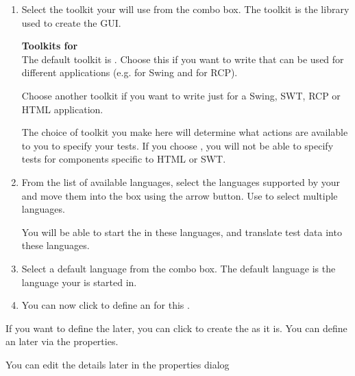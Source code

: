 \begin{enumerate}
\item Select the toolkit your \gdproject{} will use from the combo box. The toolkit is the library used to create the GUI. 

\textbf{Toolkits for \gdprojects{}}\\
\label{projtoolkit}
The default toolkit is . Choose this if you want to write \gdcases{} that can be used for different applications (e.g. for Swing and for RCP).

Choose another toolkit if you want to write \gdcases{} just for a Swing, SWT, RCP or HTML application. 

The choice of toolkit you make here will determine what actions are available to you to specify your tests. If you choose , you will not be able to specify tests for components specific to HTML or SWT.

\item From the list of available languages, select the languages supported by your \gdaut{} and move them into the  box using the arrow button. Use  to select multiple languages.

You will be able to start the \gdaut{} in these languages, and translate test data into these languages. 


\item Select a default language from the combo box. The default language is the language your \gdproject{} is started in. 

\item You can now click  to define an \gdaut{} for this \gdproject{} .
\end{enumerate}

If you want to define the \gdaut{} later, you can click  to create the \gdproject{} as it is. You can define an \gdaut{} later via the \gdproject{} properties. 

You can edit the \gdproject{} details later in the \gdproject{} properties dialog 
\clearpage



